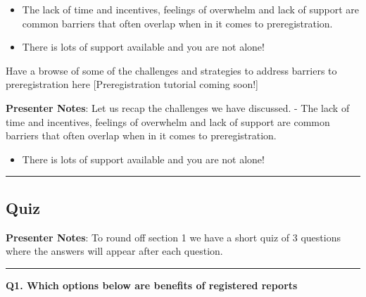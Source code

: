 \documentclass[
  letterpaper,
  DIV=11,
  numbers=noendperiod]{scrartcl}
\providecommand{\tightlist}{%
  \setlength{\itemsep}{0pt}\setlength{\parskip}{0pt}}
\begin{document}
\begin{itemize}
\item
  The lack of time and incentives, feelings of overwhelm and lack of
  support are common barriers that often overlap when in it comes to
  preregistration.
\item
  There is lots of support available and you are not alone!
\end{itemize}

\begin{tcolorbox}[enhanced jigsaw, arc=.35mm, bottomrule=.15mm, bottomtitle=1mm, breakable, colback=white, colbacktitle=quarto-callout-tip-color!10!white, colframe=quarto-callout-tip-color-frame, coltitle=black, left=2mm, leftrule=.75mm, opacityback=0, opacitybacktitle=0.6, rightrule=.15mm, title=\textcolor{quarto-callout-tip-color}{\faLightbulb}\hspace{0.5em}{Find out more}, titlerule=0mm, toprule=.15mm, toptitle=1mm]

Have a browse of some of the challenges and strategies to address
barriers to preregistration here {[}Preregistration tutorial coming
soon!{]}

\end{tcolorbox}

\textbf{Presenter Notes}: Let us recap the challenges we have discussed.
- The lack of time and incentives, feelings of overwhelm and lack of
support are common barriers that often overlap when in it comes to
preregistration.

\begin{itemize}
\tightlist
\item
  There is lots of support available and you are not alone!
\end{itemize}

\begin{center}\rule{0.5\linewidth}{0.5pt}\end{center}

\subsection{Quiz}\label{quiz}

\textbf{Presenter Notes}: To round off section 1 we have a short quiz of
3 questions where the answers will appear after each question.

\begin{center}\rule{0.5\linewidth}{0.5pt}\end{center}

\textbf{Q1. Which options below are benefits of registered reports}
\end{document}
